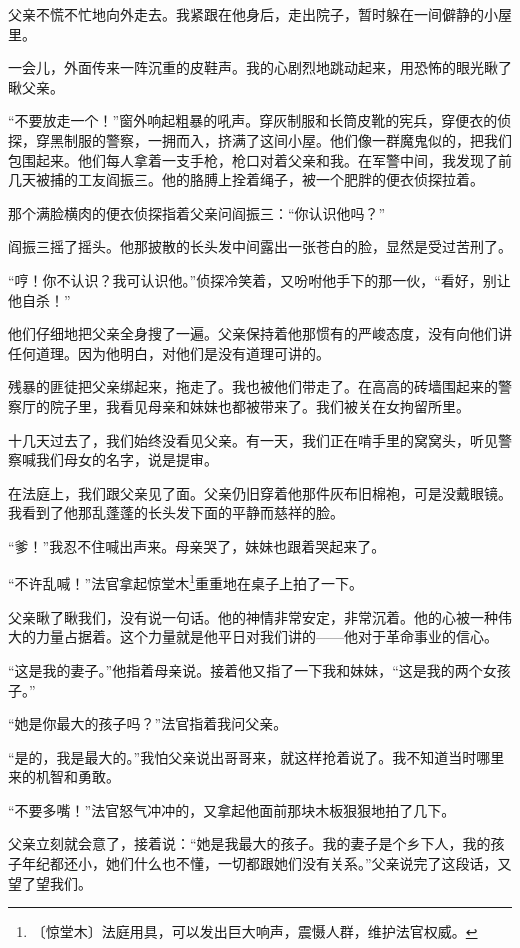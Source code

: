 \documentclass[12pt,UTF-8,openany]{ctexbook}
\begin{document}
\begin{large}
    父亲不慌不忙地向外走去。我紧跟在他身后，走出院子，暂时躲在一间僻静的小屋里。
    
    一会儿，外面传来一阵沉重的皮鞋声。我的心剧烈地跳动起来，用恐怖的眼光瞅了瞅父亲。
    
    “不要放走一个！”窗外响起粗暴的吼声。穿灰制服和长筒皮靴的宪兵，穿便衣的侦探，穿黑制服的警察，一拥而入，挤满了这间小屋。他们像一群魔鬼似的，把我们包围起来。他们每人拿着一支手枪，枪口对着父亲和我。在军警中间，我发现了前几天被捕的工友阎振三。他的胳膊上拴着绳子，被一个肥胖的便衣侦探拉着。
    
    那个满脸横肉的便衣侦探指着父亲问阎振三：“你认识他吗？”
    
    阎振三摇了摇头。他那披散的长头发中间露出一张苍白的脸，显然是受过苦刑了。
    
    “哼！你不认识？我可认识他。”侦探冷笑着，又吩咐他手下的那一伙，“看好，别让他自杀！”
    
    他们仔细地把父亲全身搜了一遍。父亲保持着他那惯有的严峻态度，没有向他们讲任何道理。因为他明白，对他们是没有道理可讲的。
    
    残暴的匪徒把父亲绑起来，拖走了。我也被他们带走了。在高高的砖墙围起来的警察厅的院子里，我看见母亲和妹妹也都被带来了。我们被关在女拘留所里。
    
    十几天过去了，我们始终没看见父亲。有一天，我们正在啃手里的窝窝头，听见警察喊我们母女的名字，说是提审。
    
    在法庭上，我们跟父亲见了面。父亲仍旧穿着他那件灰布旧棉袍，可是没戴眼镜。我看到了他那乱蓬蓬的长头发下面的平静而慈祥的脸。
    
    “爹！”我忍不住喊出声来。母亲哭了，妹妹也跟着哭起来了。
    
    “不许乱喊！”法官拿起惊堂木\footnote{〔惊堂木〕法庭用具，可以发出巨大响声，震慑人群，维护法官权威。}重重地在桌子上拍了一下。
    
    父亲瞅了瞅我们，没有说一句话。他的神情非常安定，非常沉着。他的心被一种伟大的力量占据着。这个力量就是他平日对我们讲的——他对于革命事业的信心。
    
    “这是我的妻子。”他指着母亲说。接着他又指了一下我和妹妹，“这是我的两个女孩子。”
    
    “她是你最大的孩子吗？”法官指着我问父亲。
    
    “是的，我是最大的。”我怕父亲说出哥哥来，就这样抢着说了。我不知道当时哪里来的机智和勇敢。
    
    “不要多嘴！”法官怒气冲冲的，又拿起他面前那块木板狠狠地拍了几下。
    
    父亲立刻就会意了，接着说：“她是我最大的孩子。我的妻子是个乡下人，我的孩子年纪都还小，她们什么也不懂，一切都跟她们没有关系。”父亲说完了这段话，又望了望我们。
    

\end{large}
\end{document}
